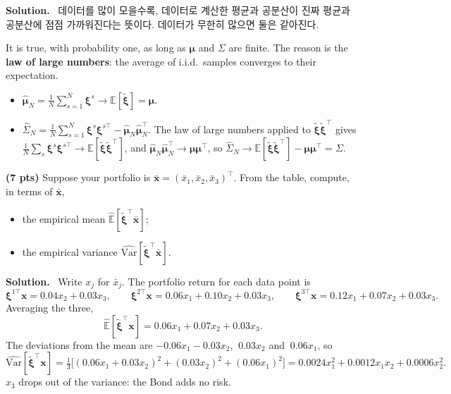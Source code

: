 \documentclass[10pt]{article}
\newenvironment{solution}
  {\par\smallskip\begingroup\color{solink}\textbf{Solution.}\ }
  {\par\endgroup}
\begin{document}
\begin{parts}
\begin{solution}
데이터를 많이 모을수록, 데이터로 계산한 평균과 공분산이 진짜 평균과 공분산에 점점 가까워진다는 뜻이다.
데이터가 무한히 많으면 둘은 같아진다.
\par\smallskip
It is true, with probability one, as long as $\bm{\mu}$ and $\Sigma$ are finite. The reason is the
\textbf{law of large numbers}: the average of i.i.d.\ samples converges to their expectation.
\begin{itemize}[leftmargin=1.6em, itemsep=2pt, topsep=3pt]
  \item $\widehat{\bm{\mu}}_N = \frac1N \sum_{s=1}^{N} \bm{\xi}^s \to \mathbb{E}[\tilde{\bm{\xi}}] = \bm{\mu}$.
  \item $\widehat{\Sigma}_N = \frac1N \sum_{s=1}^{N} \bm{\xi}^s\bm{\xi}^{s\top} - \widehat{\bm{\mu}}_N\widehat{\bm{\mu}}_N^{\top}$. The law of large
    numbers applied to $\tilde{\bm{\xi}}\tilde{\bm{\xi}}^{\top}$ gives
    $\frac1N \sum_s \bm{\xi}^s\bm{\xi}^{s\top} \to \mathbb{E}[\tilde{\bm{\xi}}\tilde{\bm{\xi}}^{\top}]$, and
    $\widehat{\bm{\mu}}_N\widehat{\bm{\mu}}_N^{\top} \to \bm{\mu}\bm{\mu}^{\top}$, so
    $\widehat{\Sigma}_N \to \mathbb{E}[\tilde{\bm{\xi}}\tilde{\bm{\xi}}^{\top}] - \bm{\mu}\bm{\mu}^{\top} = \Sigma$.
\end{itemize}
\end{solution}

\item \textbf{(7 pts)} Suppose your portfolio is $\bar{\bm{x}} = (\bar{x}_1, \bar{x}_2, \bar{x}_3)^{\top}$.
  From the table, compute, in terms of $\bar{\bm{x}}$,
  \begin{itemize}[leftmargin=2.2em, itemsep=2pt, topsep=3pt]
    \item the empirical mean $\widehat{\mathbb{E}}[\tilde{\bm{\xi}}^{\top}\bar{\bm{x}}]$;
    \item the empirical variance $\widehat{\mathrm{Var}}[\tilde{\bm{\xi}}^{\top}\bar{\bm{x}}]$.
  \end{itemize}

\begin{solution}
Write $x_j$ for $\bar{x}_j$. The portfolio return for each data point is
\[
  \bm{\xi}^{1\top}\bm{x} = 0.04x_2 + 0.03x_3, \qquad
  \bm{\xi}^{2\top}\bm{x} = 0.06x_1 + 0.10x_2 + 0.03x_3, \qquad
  \bm{\xi}^{3\top}\bm{x} = 0.12x_1 + 0.07x_2 + 0.03x_3 .
\]
Averaging the three,
\[
  \widehat{\mathbb{E}}[\tilde{\bm{\xi}}^{\top}\bm{x}] = 0.06x_1 + 0.07x_2 + 0.03x_3 .
\]
The deviations from the mean are $-0.06x_1 - 0.03x_2$, $\ 0.03x_2$ and $\ 0.06x_1$, so
\[
  \widehat{\mathrm{Var}}[\tilde{\bm{\xi}}^{\top}\bm{x}]
  = \tfrac13\big[(0.06x_1 + 0.03x_2)^2 + (0.03x_2)^2 + (0.06x_1)^2\big]
  = 0.0024x_1^2 + 0.0012x_1x_2 + 0.0006x_2^2 .
\]
$x_3$ drops out of the variance: the Bond adds no risk.
\end{solution}


\end{parts}
\end{document}
